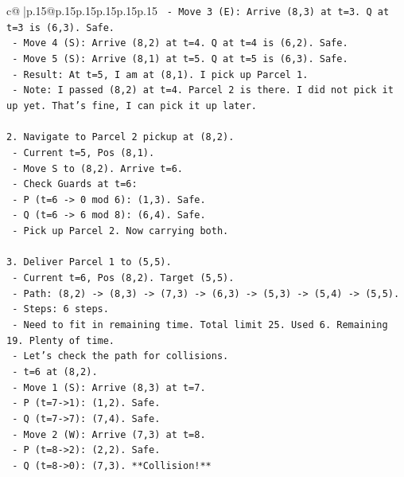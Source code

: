 \documentclass{article}
\begin{document}
{\begin{supertabular}{c@{$\;$}|p{.15\linewidth}@{}p{.15\linewidth}p{.15\linewidth}p{.15\linewidth}p{.15\linewidth}p{.15\linewidth}}
{{{\texttt{       {-} Move 3 (E): Arrive (8,3) at t=3. Q at t=3 is (6,3). Safe.} \\
\texttt{       {-} Move 4 (S): Arrive (8,2) at t=4. Q at t=4 is (6,2). Safe.} \\
\texttt{       {-} Move 5 (S): Arrive (8,1) at t=5. Q at t=5 is (6,3). Safe.} \\
\texttt{   {-} Result: At t=5, I am at (8,1). I pick up Parcel 1.} \\
\texttt{   {-} Note: I passed (8,2) at t=4. Parcel 2 is there. I did not pick it up yet. That's fine, I can pick it up later.} \\
\\ 
\texttt{2. Navigate to Parcel 2 pickup at (8,2).} \\
\texttt{   {-} Current t=5, Pos (8,1).} \\
\texttt{   {-} Move S to (8,2). Arrive t=6.} \\
\texttt{   {-} Check Guards at t=6:} \\
\texttt{     {-} P (t=6 {-}> 0 mod 6): (1,3). Safe.} \\
\texttt{     {-} Q (t=6 {-}> 6 mod 8): (6,4). Safe.} \\
\texttt{   {-} Pick up Parcel 2. Now carrying both.} \\
\\ 
\texttt{3. Deliver Parcel 1 to (5,5).} \\
\texttt{   {-} Current t=6, Pos (8,2). Target (5,5).} \\
\texttt{   {-} Path: (8,2) {-}> (8,3) {-}> (7,3) {-}> (6,3) {-}> (5,3) {-}> (5,4) {-}> (5,5).} \\
\texttt{   {-} Steps: 6 steps.} \\
\texttt{   {-} Need to fit in remaining time. Total limit 25. Used 6. Remaining 19. Plenty of time.} \\
\texttt{   {-} Let's check the path for collisions.} \\
\texttt{   {-} t=6 at (8,2).} \\
\texttt{   {-} Move 1 (S): Arrive (8,3) at t=7.} \\
\texttt{     {-} P (t=7{-}>1): (1,2). Safe.} \\
\texttt{     {-} Q (t=7{-}>7): (7,4). Safe.} \\
\texttt{   {-} Move 2 (W): Arrive (7,3) at t=8.} \\
\texttt{     {-} P (t=8{-}>2): (2,2). Safe.} \\
\texttt{     {-} Q (t=8{-}>0): (7,3). **Collision!**} \\
}}}
\end{supertabular}}
\end{document}
